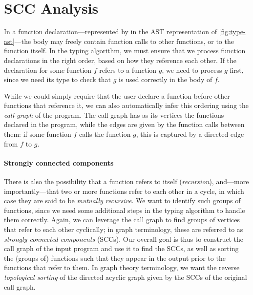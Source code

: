 




\section{SCC Analysis} \label{sec:scc-analysis}

In a function declaration---represented by  in the
AST representation of \cref{fig:type-ast}---the body may freely contain function
calls to other functions, or to the function itself.
In the typing algorithm, we must ensure that we process function declarations in
the right order, based on how they reference each other.
If the declaration for some function $f$ refers to a function $g$, we need to
process $g$ first, since we need its type to check that $g$ is used correctly in
the body of $f$.

While we could simply require that the user declare a function before other
functions that reference it, we can also automatically infer this ordering using
the \emph{call graph} of the program.
The call graph has as its vertices the functions declared in the program, while
the edges are given by the function calls between them: if some function $f$
calls the function $g$, this is captured by a directed edge from $f$ to $g$.

\paragraph{Strongly connected components}
There is also the possibility that a function refers to itself
(\emph{recursion}), and---more importantly---that two or more functions refer to
each other in a cycle, in which case they are said to be \emph{mutually
recursive}. We want to identify such groups of functions, since we need some
additional steps in the typing algorithm to handle them correctly.
Again, we can leverage the call graph to find groups of vertices that refer to
each other cyclically; in graph terminology, these are referred to as
\emph{strongly connected components} (SCCs).
Our overall goal is thus to construct the call graph of the input program and
use it to find the SCCs, as well as sorting the (groups of) functions such that
they appear in the output prior to the functions that refer to them.
In graph theory terminology, we want the reverse \emph{topological sorting} of
the directed acyclic graph given by the SCCs of the original call graph.

